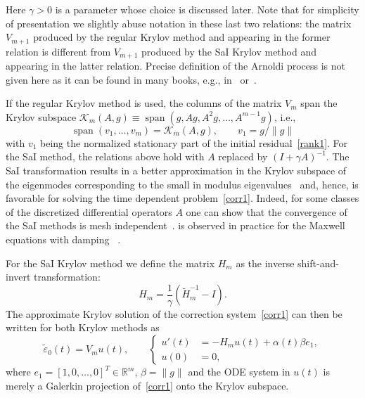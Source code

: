 \documentclass[11pt]{elsarticle}
\newcommand{\eps}{\varepsilon}
\newcommand{\Kk}{\mathcal{K}}
\newcommand{\Rr}{\mathbb{R}}
\newcommand{\Span}{\mathop{\mathrm{span}}}
\begin{document}
Here $\gamma>0$ is a parameter whose choice is discussed later.
Note that for simplicity of presentation we slightly abuse notation in these 
last 
two relations: the matrix $V_{m+1}$ produced by the regular Krylov method
and appearing in the former relation
is different from $V_{m+1}$ 
produced by the SaI Krylov method and appearing in the latter relation.
Precise definition of the Arnoldi process is not given here as 
it can be found in many books, e.g., 
in~\cite[Algorithm~6.1]{SaadBook2003} or~\cite[Figure~3.1]{Henk:book}.
  
If the regular Krylov method is used, the columns of the matrix $V_m$ 
span the Krylov subspace 
$\Kk_m(A,g) \equiv\Span (g, Ag, A^2g, \dots, A^{m-1} g )$, i.e., 
\begin{equation}
\label{Krylov}
\Span(v_1,\dots,v_m)=\Kk_m(A,g), \qquad v_1=g/\|g\|  
\end{equation}
with $v_1$ being the normalized stationary part of the initial 
residual~\eqref{rank1}.  For the SaI method, the relations above hold with $A$ 
replaced by $(I+\gamma A)^{-1}$.
The SaI transformation results in a better approximation
in the Krylov subspace of the eigenmodes corresponding to
the small in modulus eigenvalues~\cite{MoretNovati04,EshofHochbruck06} 
and, hence, is favorable
for solving the time dependent problem~\eqref{corr1}.
Indeed, for some classes of the discretized differential operators $A$
one can show that the convergence of the SaI methods is mesh 
independent~\cite{EshofHochbruck06,GoecklerGrimm2014}.
 is observed
in practice for the Maxwell equations with damping ~\cite{Botchev2016}.

For the SaI Krylov method we define the matrix $H_m$ 
as the inverse shift-and-invert transformation:
\begin{equation}
\label{saiHm}
H_m = \dfrac1\gamma (\tilde{H}_m^{-1} - I).
\end{equation}
The approximate Krylov solution of the correction 
system~\eqref{corr1} can then be written 
for both Krylov methods as
\begin{equation}
\label{corr2}
\tilde{\eps}_0(t) = V_m u(t),
\qquad
\left\{
\begin{aligned}
u'(t) &= - H_m u(t) + \alpha(t)\beta e_1,
\\  
u(0) &= 0,
\end{aligned}
\right.  
\end{equation}
where $e_1=[1,0,\dots,0]^T\in\Rr^m$, $\beta=\|g\|$ and the ODE system in $u(t)$ 
is merely a Galerkin projection of~\eqref{corr1}
onto the Krylov subspace.
\end{document}
